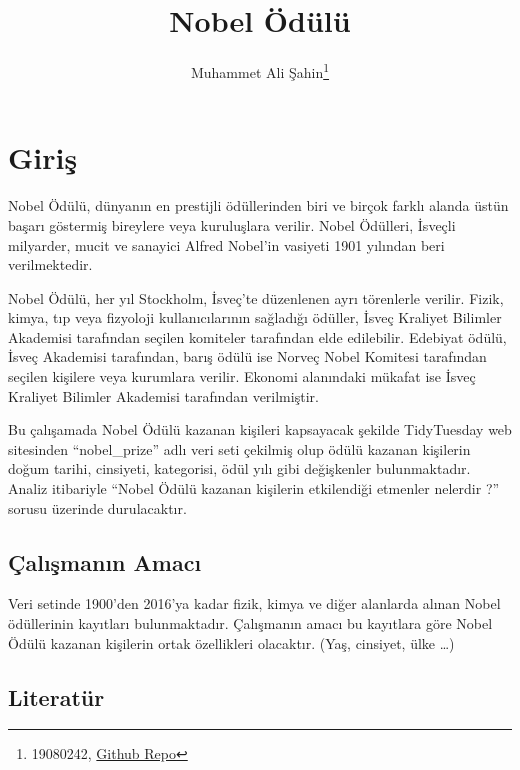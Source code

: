\documentclass[
  12pt,
]{article}
\title{Nobel Ödülü}
\author{Muhammet Ali Şahin\footnote{19080242, \href{https://github.com/muhammetalisahin/Muhammet.git}{Github Repo}}}
\date{}
\begin{document}
\maketitle

\hypertarget{giriux15f}{%
\section{Giriş}\label{giriux15f}}

Nobel Ödülü, dünyanın en prestijli ödüllerinden biri ve birçok farklı alanda üstün başarı göstermiş bireylere veya kuruluşlara verilir. Nobel Ödülleri, İsveçli milyarder, mucit ve sanayici Alfred Nobel'in vasiyeti 1901 yılından beri verilmektedir.

Nobel Ödülü, her yıl Stockholm, İsveç'te düzenlenen ayrı törenlerle verilir. Fizik, kimya, tıp veya fizyoloji kullanıcılarının sağladığı ödüller, İsveç Kraliyet Bilimler Akademisi tarafından seçilen komiteler tarafından elde edilebilir. Edebiyat ödülü, İsveç Akademisi tarafından, barış ödülü ise Norveç Nobel Komitesi tarafından seçilen kişilere veya kurumlara verilir. Ekonomi alanındaki mükafat ise İsveç Kraliyet Bilimler Akademisi tarafından verilmiştir.

Bu çalışamada Nobel Ödülü kazanan kişileri kapsayacak şekilde TidyTuesday web sitesinden ``nobel\_prize''
adlı veri seti çekilmiş olup ödülü kazanan kişilerin doğum tarihi, cinsiyeti, kategorisi, ödül yılı
gibi değişkenler bulunmaktadır. Analiz itibariyle ``Nobel Ödülü kazanan kişilerin etkilendiği
etmenler nelerdir ?'' sorusu üzerinde durulacaktır.

\hypertarget{uxe7alux131ux15fmanux131n-amacux131}{%
\subsection{Çalışmanın Amacı}\label{uxe7alux131ux15fmanux131n-amacux131}}

Veri setinde 1900'den 2016'ya kadar fizik, kimya ve diğer alanlarda alınan Nobel ödüllerinin
kayıtları bulunmaktadır. Çalışmanın amacı bu kayıtlara göre Nobel Ödülü kazanan kişilerin
ortak özellikleri olacaktır. (Yaş, cinsiyet, ülke \ldots)

\hypertarget{literatuxfcr}{%
\subsection{Literatür}\label{literatuxfcr}}
\end{document}
